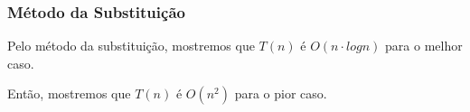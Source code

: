 \subsubsection{Método da Substituição}

Pelo método da substituição, mostremos que $T(n)$ é $O(n \cdot log n)$ para o melhor caso.

Então, mostremos que $T(n)$ é $O(n^2)$ para o pior caso.
